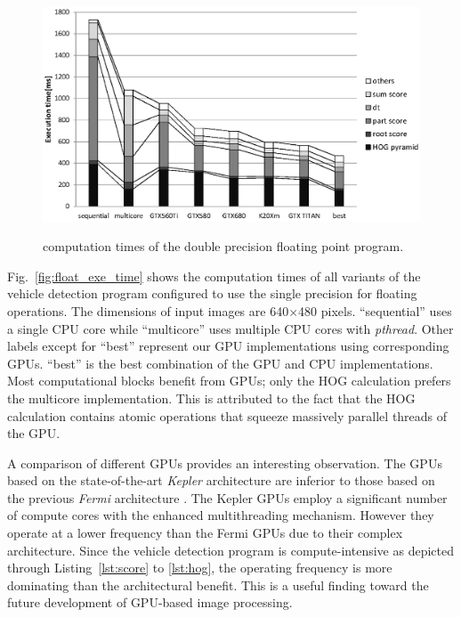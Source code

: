 \begin{figure}[t]
 \begin{center}
  \includegraphics[width=\hsize]{fig/double_exe_time.eps}\\
  \caption{computation times of the double precision floating point program.}
  \label{fig:double_exe_time}
 \end{center}
\end{figure}

Fig.~\ref{fig:float_exe_time} shows the computation times of all variants
of the vehicle detection program configured to use the single precision
for floating operations.
The dimensions of input images are 640$\times$480 pixels.
``sequential'' uses a single CPU core while ``multicore'' uses multiple
CPU cores with \textit{pthread}.
Other labels except for ``best'' represent our GPU implementations using
corresponding GPUs.
``best'' is the best combination of the GPU and CPU implementations.
Most computational blocks benefit from GPUs; only the HOG calculation
prefers the multicore implementation.
This is attributed to the fact that the HOG calculation contains atomic
operations that squeeze massively parallel threads of the GPU.

A comparison of different GPUs provides an interesting observation.
The GPUs based on the state-of-the-art \textit{Kepler}
architecture \cite{NVIDIA_Kepler} are inferior to those based on the
previous \textit{Fermi} architecture \cite{NVIDIA_Fermi}.
The Kepler GPUs employ a significant number of compute cores with the
enhanced multithreading mechanism.
However they operate at a lower frequency than the Fermi GPUs due to
their complex architecture.
Since the vehicle detection program is compute-intensive as depicted
through Listing~\ref{lst:score} to \ref{lst:hog}, the operating 
frequency is more dominating than the architectural benefit.
This is a useful finding toward the future development of GPU-based
image processing.

